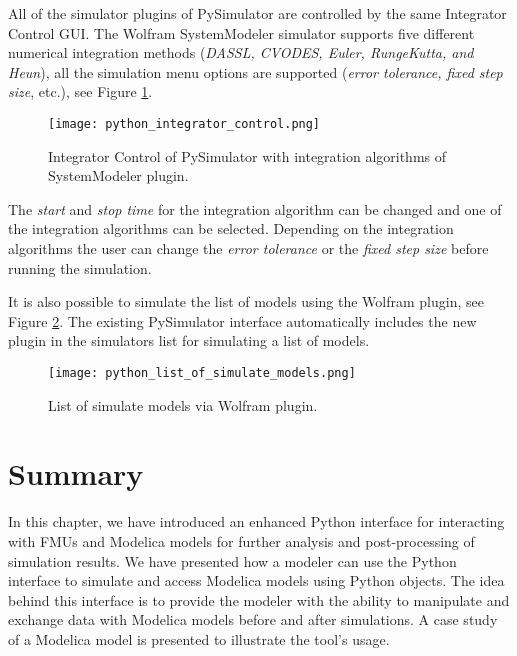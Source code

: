 All of the simulator plugins of PySimulator are controlled by the same Integrator Control GUI. The Wolfram
SystemModeler simulator supports five different numerical integration methods (\textit{DASSL, CVODES,
Euler, RungeKutta, and Heun}), all the simulation menu options are supported (\textit{error tolerance, fixed step
size}, etc.), see Figure \ref{fig:pythonintegratorcontrol}.

\begin{figure} [!h]
	\texttt{[image: python\_integrator\_control.png]}
	\caption{Integrator Control of PySimulator with integration algorithms of SystemModeler plugin.}
	\label{fig:pythonintegratorcontrol}
\end{figure}

The \textit{start} and \textit{stop time} for the integration algorithm can be changed and one of the integration algorithms
can be selected. Depending on the integration algorithms the user can change the \textit{error tolerance} or the \textit{fixed step size}
before running the simulation.

It is also possible to simulate the list of models using the Wolfram plugin, see Figure \ref{fig:pythonlistofsimulatemodels}. The existing PySimulator interface automatically 
includes the new plugin in the simulators list for simulating a list of models.

\begin{landscape}
\begin{figure}
	\texttt{[image: python\_list\_of\_simulate\_models.png]}
	\caption{List of simulate models via Wolfram plugin.}
	\label{fig:pythonlistofsimulatemodels}
\end{figure}
\end{landscape}

\section{Summary}
\label{sec:pythonsummary}

In this chapter, we have introduced an enhanced Python interface for interacting with FMUs and Modelica models for further analysis and post-processing of simulation results. We have presented how a modeler can use the Python interface to simulate and access Modelica models using Python objects. The idea behind this interface is to provide the modeler with the ability to manipulate and exchange data with Modelica models before and after simulations. A case study of a Modelica model is presented to illustrate the tool’s usage.

